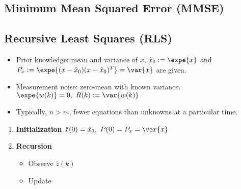 \documentclass[10pt,a4paper]{scrartcl}
\begin{document}
\begin{multicols*}{2}
\begin{multicols*}{3}


\subsection{Minimum Mean Squared Error (MMSE)}


\subsection{Recursive Least Squares (RLS)}


\begin{itemize}
\item Prior knowledge: mean and variance of $x$, $\hat{x}_0:=\expe{x}$ and $P_x:=\expe{(x-\hat{x}_0)(x-\hat{x}_0)^T}=\var{x}$ are given.
\item Measurement noise: zero-mean with known variance. $\expe{w(k)}=0,\ R(k):=\var{w(k)}$
\item Typically, $n>m$, fewer equations than unknowns at a particular time.
\end{itemize}

\begin{enumerate}
\item \textbf{Initialization} $\hat{x}(0)=\hat{x}_0,\ P(0)=P_x=\var{x}$
\item \textbf{Recursion}
\begin{itemize}
\item Observe $\bar{z}(k)$
\item Update

\end{itemize}
\end{enumerate}


\end{multicols*}
\end{multicols*}
\end{document}
